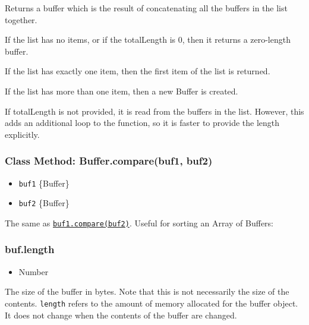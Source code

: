 Returns a buffer which is the result of concatenating all the buffers in
the list together.

If the list has no items, or if the totalLength is 0, then it returns a
zero-length buffer.

If the list has exactly one item, then the first item of the list is
returned.

If the list has more than one item, then a new Buffer is created.

If totalLength is not provided, it is read from the buffers in the list.
However, this adds an additional loop to the function, so it is faster
to provide the length explicitly.

\subsubsection{Class Method: Buffer.compare(buf1,
buf2)}\label{class-method-buffer.comparebuf1-buf2}

\begin{itemize}
\itemsep1pt\parskip0pt
\item
  \texttt{buf1} \{Buffer\}
\item
  \texttt{buf2} \{Buffer\}
\end{itemize}

The same as
\hyperref[bufferux5fbufux5fcompareux5fotherbuffer]{\texttt{buf1.compare(buf2)}}.
Useful for sorting an Array of Buffers:

\begin{Shaded}
\begin{Highlighting}[]
 \NormalTok{arr = [}\NormalTok{(}\NormalTok{), }\NormalTok{(}\NormalTok{)];}
\NormalTok{(}\NormalTok{);}
\end{Highlighting}
\end{Shaded}

\subsubsection{buf.length}\label{buf.length}

\begin{itemize}
\itemsep1pt\parskip0pt
\item
  Number
\end{itemize}

The size of the buffer in bytes. Note that this is not necessarily the
size of the contents. \texttt{length} refers to the amount of memory
allocated for the buffer object. It does not change when the contents of
the buffer are changed.


